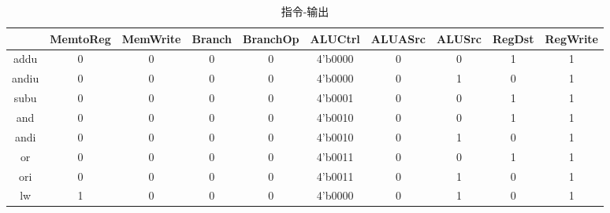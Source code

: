 \documentclass[UTF8]{ctexart}
\begin{document}
\begin{table}[H]
	\centering
	\begin{threeparttable}
		\caption{指令-输出}
		\begin{tabular}{|c|c|c|c|c|c|c|c|c|c|}
			\hline
			\rowcolor{mypink}
			\diagbox{\textbf{Inst}}{\textbf{Output}} & \textbf{MemtoReg} & \textbf{MemWrite} & \textbf{Branch} & \textbf{BranchOp} & \textbf{ALUCtrl} & \textbf{ALUASrc} & \textbf{ALUSrc} & \textbf{RegDst} & \textbf{RegWrite} \\
			\hline
			addu                                     & 0                 & 0                 & 0               & 0                 & 4'b0000          & 0                & 0               & 1               & 1                 \\
			\hline
			andiu                                    & 0                 & 0                 & 0               & 0                 & 4'b0000          & 0                & 1               & 0               & 1                 \\
			\hline
			subu                                     & 0                 & 0                 & 0               & 0                 & 4'b0001          & 0                & 0               & 1               & 1                 \\
			\hline
			and                                      & 0                 & 0                 & 0               & 0                 & 4'b0010          & 0                & 0               & 1               & 1                 \\
			\hline
			andi                                     & 0                 & 0                 & 0               & 0                 & 4'b0010          & 0                & 1               & 0               & 1                 \\
			\hline
			or                                       & 0                 & 0                 & 0               & 0                 & 4'b0011          & 0                & 0               & 1               & 1                 \\
			\hline
			ori                                      & 0                 & 0                 & 0               & 0                 & 4'b0011          & 0                & 1               & 0               & 1                 \\
			\hline
			lw                                       & 1                 & 0                 & 0               & 0                 & 4'b0000          & 0                & 1               & 0               & 1                 \\

\end{tabular}
\end{threeparttable}
\end{table}
\end{document}
